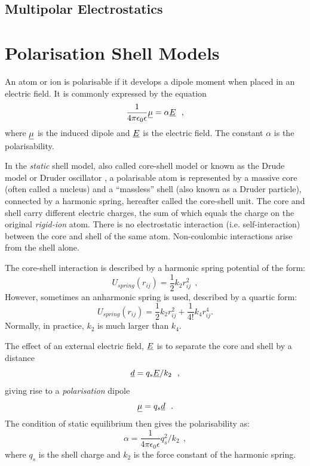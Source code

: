 \subsection{Multipolar Electrostatics}
\label{mpoles}
{ %

} %

\section{Polarisation Shell Models}
\label{shell-models}

An atom or ion is polarisable if it develops a
dipole moment when placed in an electric field.  It is commonly
expressed by the equation
\begin{equation}
\frac{1}{4\pi\epsilon_{0}\epsilon} \mbox{$\underline{\mu}$} = \alpha \mbox{$\underline{E}$}~~,
\end{equation}
where $\mbox{$\underline{\mu}$}$ is the induced dipole and $\mbox{$\underline{E}$}$ is the
electric field.  The constant $\alpha$ is the polarisability.

In the {\em static} shell model, also called core-shell model or
known as the Drude model or Druder oscillator \cite{drude-00a,drude-00b},
a polarisable atom is represented by
a massive core (often called a nucleus) and a ``massless'' shell
(also known as a Druder particle), connected by a harmonic spring,
hereafter called the core-shell unit.  The core and shell carry
different electric charges, the sum of which equals the charge on
the original {\em rigid-ion} atom.  There is no electrostatic
interaction (i.e. self-interaction) between the core and shell of
the same atom.  Non-coulombic interactions arise from the shell alone.

The core-shell interaction is described by a harmonic spring
potential of the form:
\begin{equation}
U_{spring}(r_{ij})=\frac{1}{2}k_{2} r_{ij}^{2}~~,
\end{equation}
However, sometimes an anharmonic spring is used, described by a
quartic form:
\begin{equation}
U_{spring}(r_{ij})=\frac{1}{2}k_{2} r_{ij}^{2}+\frac{1}{4!}k_{4} r_{ij}^{4}.
\end{equation}
Normally, in practice, $k_{2}$ is much larger than $k_{4}$.

The effect of an external electric field, $\mbox{$\underline{E}$}$ is to
separate the core and shell by a distance
\begin{equation}
\mbox{$\underline{d}$} = q_{s} \mbox{$\underline{E}$}/k_{2}~~,
\end{equation}
giving rise to a {\em polarisation} dipole
\begin{equation}
\mbox{$\underline{\mu}$} = q_{s} \mbox{$\underline{d}$}~~.
\end{equation}
The condition of static equilibrium then gives the polarisability as:
\begin{equation}
\alpha = \frac{1}{4\pi\epsilon_{0}\epsilon} q_{s}^{2}/k_{2}~~, \label{druder}
\end{equation}
where $q_{s}$ is the shell charge and $k_{2}$ is the force
constant of the harmonic spring.

